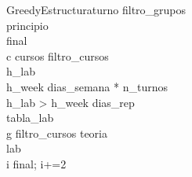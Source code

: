 \begin{pseudocode}{GreedyEstructura}{turno}
    \label{greedyestructura}
    filtro\_grupos \GETS {}\\
    principio \GETS {}\\
    final \GETS {}\\
    \FOREACH c \in cursos \DO
    \BEGIN
       filtro\_cursos \GETS {}\\
       h\_lab \GETS {}\\
       h\_week \GETS dias\_semana * n\_turnos\\

       \IF h\_lab > h\_week \THEN
       		dias\_rep \GETS {}\\

       	tabla\_lab \GETS {}\\

       	\FOREACH g \in filtro\_cursos \DO
       	\BEGIN
       		teoria \GETS {}\\
       		lab \GETS {}\\

       		\FOR i  \TO final; i+=2 \DO
       		\BEGIN
       		\END
       	\END
    \END
\end{pseudocode}
